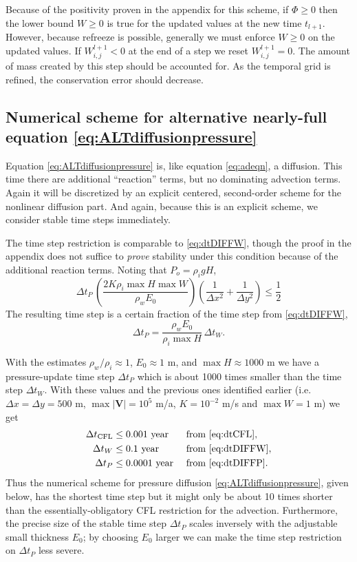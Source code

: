 \documentclass[12pt,final]{amsart}%
\newcommand\bV{\mathbf{V}}
\begin{document}
Because of the positivity proven in the appendix for this scheme, if $\Phi\ge 0$ then the lower bound $W\ge 0$ is true for the updated values at the new time $t_{l+1}$.  However, because refreeze is possible, generally we must enforce $W\ge 0$ on the updated values.  If $W_{i,j}^{l+1}<0$ at the end of a step we reset $W_{i,j}^{l+1}=0$.  The amount of mass created by this step should be accounted for.  As the temporal grid is refined, the conservation error should decrease.

\subsection*{Numerical scheme for alternative nearly-full equation \eqref{eq:ALTdiffusionpressure}}   Equation \eqref{eq:ALTdiffusionpressure} is, like equation \eqref{eq:adeqn}, a diffusion.  This time there are additional ``reaction'' terms, but no dominating advection terms.  Again it will be discretized by an explicit centered, second-order scheme for the nonlinear diffusion part.  And again, because this is an explicit scheme, we consider stable time steps immediately.

The time step restriction is comparable to \eqref{eq:dtDIFFW}, though the proof in the appendix does not suffice to \emph{prove} stability under this condition because of the additional reaction terms.  Noting that $P_o=\rho_i g H$,
\begin{equation}
\Delta t_P\, \left(\frac{2 K \rho_i \max H \max W}{\rho_w E_0}\right) \left(\frac{1}{\Delta x^2} + \frac{1}{\Delta y^2}\right) \le \frac{1}{2} \label{eq:dtDIFFP}
\end{equation}
The resulting time step is a certain fraction of the time step from \eqref{eq:dtDIFFW},
\begin{equation}
\Delta t_P = \frac{\rho_w E_0}{\rho_i \max H}\, \Delta t_W.
\end{equation}

With the estimates $\rho_w/\rho_i \approx 1$, $E_0\approx 1$ m, and $\max H \approx 1000$ m we have a pressure-update time step $\Delta t_P$ which is about 1000 times smaller than the time step $\Delta t_W$.  With these values and the previous ones identified earlier (i.e.~$\Delta x = \Delta y = 500$ m, $\max |\bV|=10^5$ m/a, $K=10^{-2}$ m/s and $\max W=1$ m) we get
\begin{align*}
  \Delta t_{\text{CFL}} &\le 0.001  \text{ year} &&\text{ from \eqref{eq:dtCFL}}, \\
  \Delta t_W            &\le 0.1    \text{ year} &&\text{ from \eqref{eq:dtDIFFW}}, \\
  \Delta t_P            &\le 0.0001 \text{ year} &&\text{ from \eqref{eq:dtDIFFP}.}
\end{align*}
Thus the numerical scheme for pressure diffusion \eqref{eq:ALTdiffusionpressure}, given below, has the shortest time step but it might only be about 10 times shorter than the essentially-obligatory CFL restriction for the advection.  Furthermore, the precise size of the stable time step $\Delta t_P$ scales inversely with the adjustable small thickness $E_0$; by choosing $E_0$ larger we can make the time step restriction on $\Delta t_P$ less severe.
\end{document}
